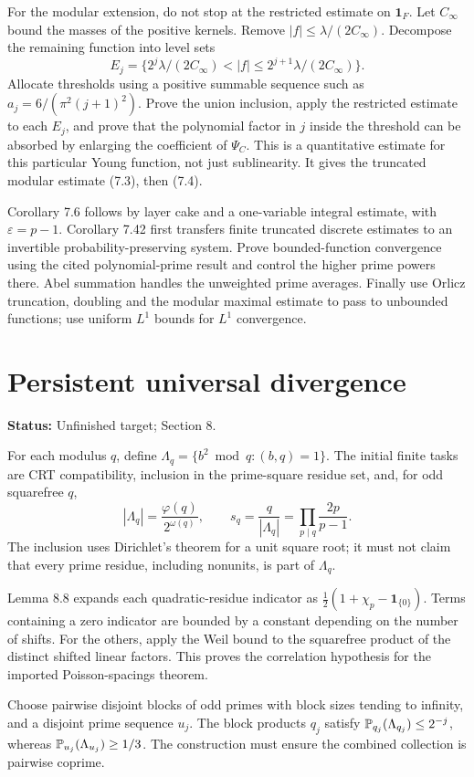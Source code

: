 \documentclass[11pt]{article}
\newcommand{\one}{\mathbf 1}\newcommand{\abs}[1]{\left|#1\right|}
\newcommand{\status}[1]{\textbf{Status:} #1.}
\newcommand{\page}{\newpage}
\begin{document}
For the modular extension, do not stop at the restricted estimate on \(\one_F\).
Let \(C_\infty\) bound the masses of the positive kernels. Remove
\(|f|\le\lambda/(2C_\infty)\). Decompose the remaining function into level sets
\[
 E_j=\{2^j\lambda/(2C_\infty)<|f|\le2^{j+1}\lambda/(2C_\infty)\}.
\]
Allocate thresholds using a positive summable sequence such as
\(a_j=6/(\pi^2(j+1)^2)\). Prove the union inclusion, apply the restricted
estimate to each \(E_j\), and prove that the polynomial factor in \(j\) inside
the threshold can be absorbed by enlarging the coefficient of \(\Psi_C\).
This is a quantitative estimate for this particular Young function, not just
sublinearity. It gives the truncated modular estimate (7.3), then (7.4).

Corollary 7.6 follows by layer cake and a one-variable integral estimate, with
\(\varepsilon=p-1\). Corollary 7.42 first transfers finite truncated discrete
estimates to an invertible probability-preserving system. Prove bounded-function
convergence using the cited polynomial-prime result and control the higher prime
powers there. Abel summation handles the unweighted prime averages. Finally use
Orlicz truncation, doubling and the modular maximal estimate to pass to unbounded
functions; use uniform \(L^1\) bounds for \(L^1\) convergence.

\page
\section{Persistent universal divergence}
\status{Unfinished target; Section 8}

For each modulus \(q\), define
\(\Lambda_q=\{b^2\bmod q:(b,q)=1\}\). The initial finite tasks are CRT
compatibility, inclusion in the prime-square residue set, and, for odd squarefree
\(q\),
\[
 |\Lambda_q|=\frac{\varphi(q)}{2^{\omega(q)}},\qquad
 s_q=\frac q{|\Lambda_q|}=\prod_{p\mid q}\frac{2p}{p-1}.
\]
The inclusion uses Dirichlet's theorem for a unit square root; it must not claim
that every prime residue, including nonunits, is part of \(\Lambda_q\).

Lemma 8.8 expands each quadratic-residue indicator as
\(\tfrac12(1+\chi_p-\one_{\{0\}})\). Terms containing a zero indicator are bounded
by a constant depending on the number of shifts. For the others, apply the Weil
bound to the squarefree product of the distinct shifted linear factors. This
proves the correlation hypothesis for the imported Poisson-spacings theorem.

Choose pairwise disjoint blocks of odd primes with block sizes tending to
infinity, and a disjoint prime sequence \(u_j\). The block products \(q_j\)
satisfy \(\mathbb P_{q_j}(\Lambda_{q_j})\le2^{-j}\), whereas
\(\mathbb P_{u_j}(\Lambda_{u_j})\ge1/3\). The construction must ensure the combined
collection is pairwise coprime.
\end{document}
